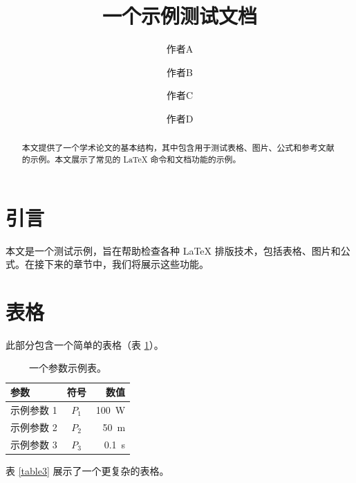 \documentclass[a4paper,UTF8]{ctexart}
\title{一个示例测试文档}
\author[1$\dag$]{作者A}
\author[1$\dag$]{作者B}
\author[1*]{作者C}
\author[1,2]{作者D}
\affil[1]{示例研究学院，示例大学}
\affil[2]{高级示例研究学院，示例大学}
\affil[*]{通讯作者：example.email@university.edu}
\affil[$\dag$]{这些作者对本文贡献相同。}
\begin{document}
\maketitle

\begin{abstract}
本文提供了一个学术论文的基本结构，其中包含用于测试表格、图片、公式和参考文献的示例。本文展示了常见的 LaTeX 命令和文档功能的示例。
\end{abstract}

\section{引言}

本文是一个测试示例，旨在帮助检查各种 LaTeX 排版技术，包括表格、图片和公式。在接下来的章节中，我们将展示这些功能。

\section{表格}

此部分包含一个简单的表格（表 \ref{tab:exampletable}）。

\begin{table}[htbp]
    \centering
    \caption{
        一个参数示例表。
    }
    \label{tab:exampletable}
    \begin{tabular}{lcr}
        \toprule
        参数 & 符号 & 数值 \\
        \midrule
        示例参数 1 & $P_1$ & \SI{100}{\watt} \\
        示例参数 2 & $P_2$ & \SI{50}{\meter} \\
        示例参数 3 & $P_3$ & \SI{0.1}{\second} \\
        \bottomrule
    \end{tabular}
\end{table}

表 \ref{table3} 展示了一个更复杂的表格。
\end{document}
